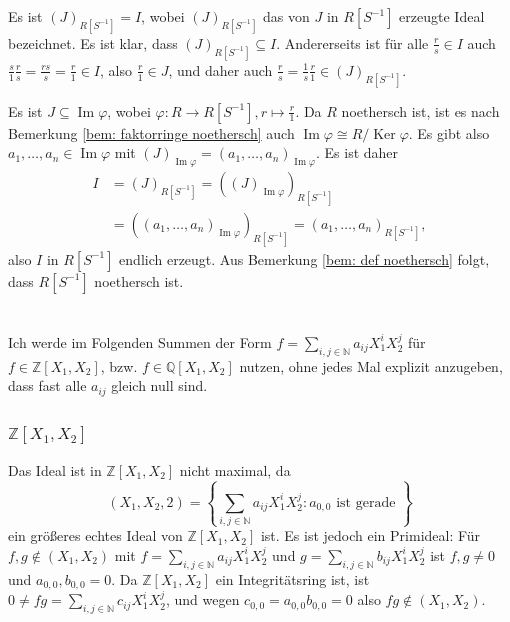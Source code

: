 \documentclass[a4paper,10pt]{article}
\theoremstyle{definition}
\newcommand{\N}{\mathbb{N}}
\newcommand{\Z}{\mathbb{Z}}
\newcommand{\Q}{\mathbb{Q}}
\newcommand{\Img}{\operatorname{Im}}
\newcommand{\Ker}{\operatorname{Ker}}
\begin{document}
Es ist $(J)_{R[S^{-1}]} = I$, wobei $(J)_{R[S^{-1}]}$ das von $J$ in $R[S^{-1}]$ erzeugte Ideal bezeichnet. Es ist klar, dass $(J)_{R[S^{-1}]} \subseteq I$. Andererseits ist für alle $\frac{r}{s} \in I$ auch $\frac{s}{1} \frac{r}{s} = \frac{rs}{s} = \frac{r}{1} \in I$, also $\frac{r}{1} \in J$, und daher auch $\frac{r}{s} = \frac{1}{s} \frac{r}{1} \in (J)_{R[S^{-1}]}$.

Es ist $J \subseteq \Img \varphi$, wobei $\varphi : R \rightarrow R[S^{-1}], r \mapsto \frac{r}{1}$. Da $R$ noethersch ist, ist es nach Bemerkung \ref{bem: faktorringe noethersch} auch $\Img \varphi \cong R / \Ker \varphi$. Es gibt also $a_1, \ldots, a_n \in \Img \varphi$ mit $(J)_{\Img \varphi} = (a_1, \ldots, a_n)_{\Img \varphi}$. Es ist daher
\begin{align*}
 I
 &= (J)_{R[S^{-1}]}
 = ((J)_{\Img \varphi})_{R[S^{-1}]} \\
 &= ((a_1, \ldots, a_n)_{\Img \varphi})_{R[S^{-1}]}
 = (a_1, \ldots, a_n)_{R[S^{-1}]},
\end{align*}
also $I$ in $R[S^{-1}]$ endlich erzeugt. Aus Bemerkung \ref{bem: def noethersch} folgt, dass $R[S^{-1}]$ noethersch ist.





\section{}
Ich werde im Folgenden Summen der Form $f = \sum_{i,j \in \N} a_{ij} X_1^i X_2^j$ für $f \in \Z[X_1, X_2]$, bzw. $f \in \Q[X_1, X_2]$ nutzen, ohne jedes Mal explizit anzugeben, dass fast alle $a_{ij}$ gleich null sind.


\subsection{}

\subsubsection{$\Z[X_1, X_2]$}
Das Ideal ist in $\Z[X_1, X_2]$ nicht maximal, da
\[
 (X_1, X_2, 2) = \left\{\sum_{i,j \in \N} a_{ij} X_1^i X_2^j : a_{0,0} \text{ ist gerade }\right\}
\]
ein größeres echtes Ideal von $\Z[X_1, X_2]$ ist. Es ist jedoch ein Primideal: Für $f,g \not\in (X_1, X_2)$ mit $f = \sum_{i,j \in \N} a_{ij} X^i_1 X^j_2$ und $g = \sum_{i,j \in \N} b_{ij} X^i_1 X^j_2$ ist $f,g \neq 0$ und $a_{0,0}, b_{0,0} = 0$. Da $\Z[X_1, X_2]$ ein Integritätsring ist, ist $0 \neq fg = \sum_{i,j \in \N} c_{ij} X^i_1 X^j_2$, und wegen $c_{0,0} = a_{0,0} b_{0,0} = 0$ also $fg \not\in (X_1, X_2)$.
\end{document}
